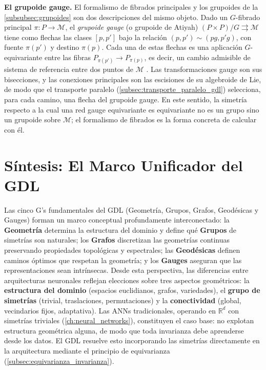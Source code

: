 \textbf{El grupoide gauge.} El formalismo de fibrados principales y los grupoides de la \autoref{subsubsec:grupoides} son dos descripciones del mismo objeto. Dado un $G$-fibrado principal $\pi: P \to \mathcal{M}$, el \textit{grupoide gauge} (o grupoide de Atiyah) $(P \times P)/G \rightrightarrows \mathcal{M}$ tiene como flechas las clases $[p, p']$ bajo la relación $(p, p') \sim (pg, p'g)$, con fuente $\pi(p')$ y destino $\pi(p)$. Cada una de estas flechas es una aplicación $G$-equivariante entre las fibras $P_{\pi(p')} \to P_{\pi(p)}$, es decir, un cambio admisible de sistema de referencia entre dos puntos de $\mathcal{M}$ \citep{mackenzie2005general, brown2002jauge}. Las transformaciones gauge son sus bisecciones, y las conexiones principales son las escisiones de su algebroide de Lie, de modo que el transporte paralelo (\autoref{subsec:transporte_paralelo_gdl}) selecciona, para cada camino, una flecha del grupoide gauge. En este sentido, la simetría respecto a la cual una red gauge equivariante es equivariante no es un grupo sino un grupoide sobre $\mathcal{M}$; el formalismo de fibrados es la forma concreta de calcular con él.


\section{Síntesis: El Marco Unificador del GDL}\label{sec:sintesis_marco_unificador}

Las cinco G's fundamentales del \gls{GDL} (Geometría, Grupos, Grafos, Geodésicas y Gauges) forman un marco conceptual profundamente interconectado: la \textbf{Geometría} determina la estructura del dominio y define qué \textbf{Grupos} de simetrías son naturales; los \textbf{Grafos} discretizan las geometrías continuas preservando propiedades topológicas y espectrales; las \textbf{Geodésicas} definen caminos óptimos que respetan la geometría; y los \textbf{Gauges} aseguran que las representaciones sean intrínsecas. Desde esta perspectiva, las diferencias entre arquitecturas neuronales reflejan elecciones sobre tres aspectos geométricos: la \textbf{estructura del dominio} (espacios euclidianos, grafos, variedades), el \textbf{grupo de simetrías} (trivial, traslaciones, permutaciones) y la \textbf{conectividad} (global, vecindarios fijos, adaptativa). Las \glspl{ANN} tradicionales, operando en $\mathbb{R}^d$ con simetrías triviales (\autoref{ch:neural_networks}), constituyen el caso base: no explotan estructura geométrica alguna, de modo que toda invarianza debe aprenderse desde los datos. El \gls{GDL} resuelve esto incorporando las simetrías directamente en la arquitectura mediante el principio de equivarianza (\autoref{subsec:equivarianza_invarianza}).

